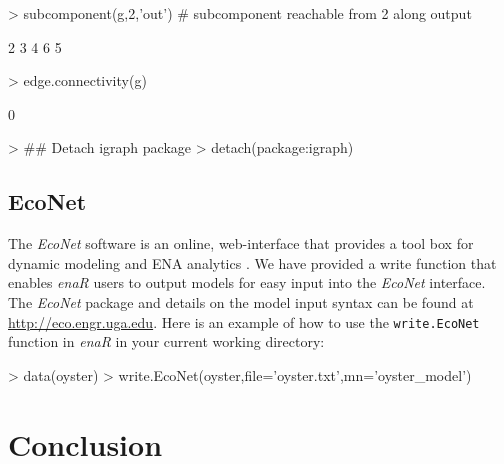 \documentclass[article]{jss}
\begin{document}
\begin{Schunk}
\begin{Sinput}
> subcomponent(g,2,'out') # subcomponent reachable from 2 along output
\end{Sinput}
\begin{Soutput}
[1] 2 3 4 6 5
\end{Soutput}
\begin{Sinput}
> edge.connectivity(g)
\end{Sinput}
\begin{Soutput}
[1] 0
\end{Soutput}
\begin{Sinput}
> ## Detach igraph package
> detach(package:igraph)
\end{Sinput}
\end{Schunk}

\subsection{EcoNet}

The \textit{EcoNet} software is an online, web-interface that provides
a tool box for dynamic modeling and ENA analytics \cite{kazanci07}. We
have provided a write function that enables \textit{enaR} users to
output models for easy input into the \textit{EcoNet} interface. The
\textit{EcoNet} package and details on the model input syntax can be
found at \url{http://eco.engr.uga.edu}. Here is an example of how to
use the \texttt{write.EcoNet} function in \textit{enaR} in your
current working directory:

\begin{Schunk}
\begin{Sinput}
> data(oyster)
> write.EcoNet(oyster,file='oyster.txt',mn='oyster_model')
\end{Sinput}
\end{Schunk}


\section{Conclusion}
\end{document}
